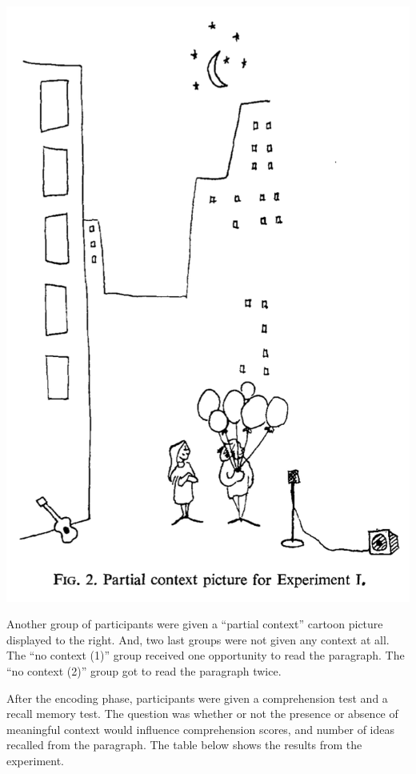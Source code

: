 \documentclass[
  oneside,
  12pt]{crumpbook}
\newenvironment{floatright25}{%
  \wrapfigure{R}{.25\textwidth}%
  }{%
  \endwrapfigure}
\begin{document}
\begin{floatright25}
\includegraphics[width=1\linewidth]{imgs/Bransford_partial}

\end{floatright25}

Another group of participants were given a ``partial context'' cartoon picture displayed to the right. And, two last groups were not given any context at all. The ``no context (1)'' group received one opportunity to read the paragraph. The ``no context (2)'' group got to read the paragraph twice.

After the encoding phase, participants were given a comprehension test and a recall memory test. The question was whether or not the presence or absence of meaningful context would influence comprehension scores, and number of ideas recalled from the paragraph. The table below shows the results from the experiment.
\end{document}
